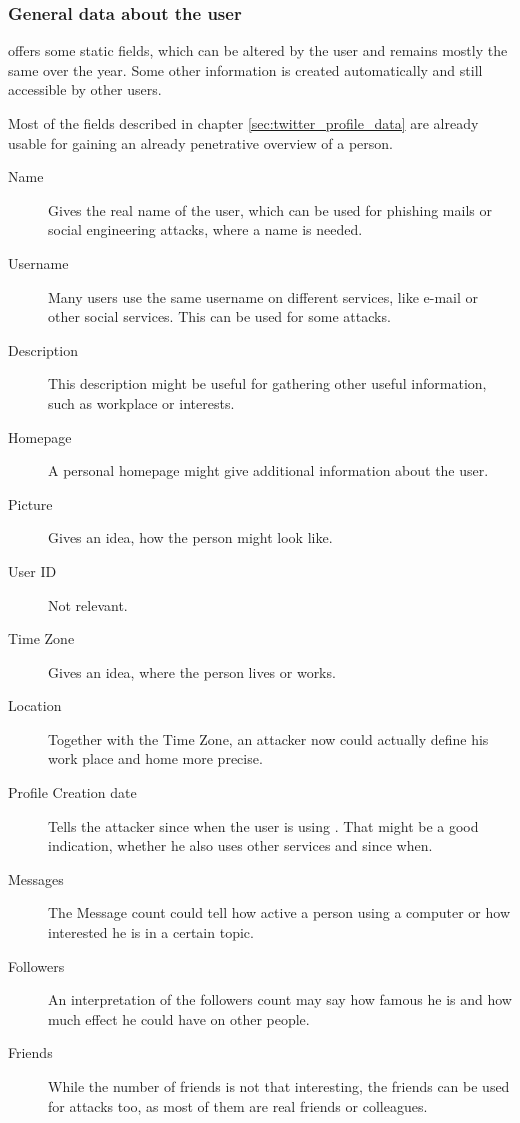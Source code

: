 \subsubsection{General data about the user}
\Twitter{} offers some static fields, which can be altered by the user and
remains mostly the same over the year. Some other information is created
automatically and still accessible by other users.

Most of the fields described in chapter \ref{sec:twitter_profile_data} are
already usable for gaining an already penetrative overview of a person.

\begin{description}
\item[Name] Gives the real name of the user, which can be used for
phishing mails or social engineering attacks, where a name is needed.

\item[Username] Many users use the same username on different
services, like e-mail or other social services. This can be used for some
attacks.

\item[Description] This description might be useful for gathering other useful
information, such as workplace or interests.

\item[Homepage] A personal homepage might give additional
information about the user.

\item[Picture] Gives an idea, how the person might
look like.

\item[User ID] Not relevant.

\item[Time Zone] Gives an idea, where the person
lives or works.

\item[Location] Together with the Time Zone, an attacker now
could actually define his work place and home more precise.

\item[Profile Creation date] Tells the attacker
since when the user is using \Twitter{}. That might be a good indication,
whether he also uses other services and since when.

\item[Messages] The Message count could tell how active a person using a
computer or how interested he is in a certain topic.

\item[Followers] An interpretation of the followers count may say how
famous he is and how much effect he could have on other people.

\item[Friends] While the number of friends is not that interesting,
the friends can be used for attacks too, as most of them are real friends
or colleagues.
\end{description}

